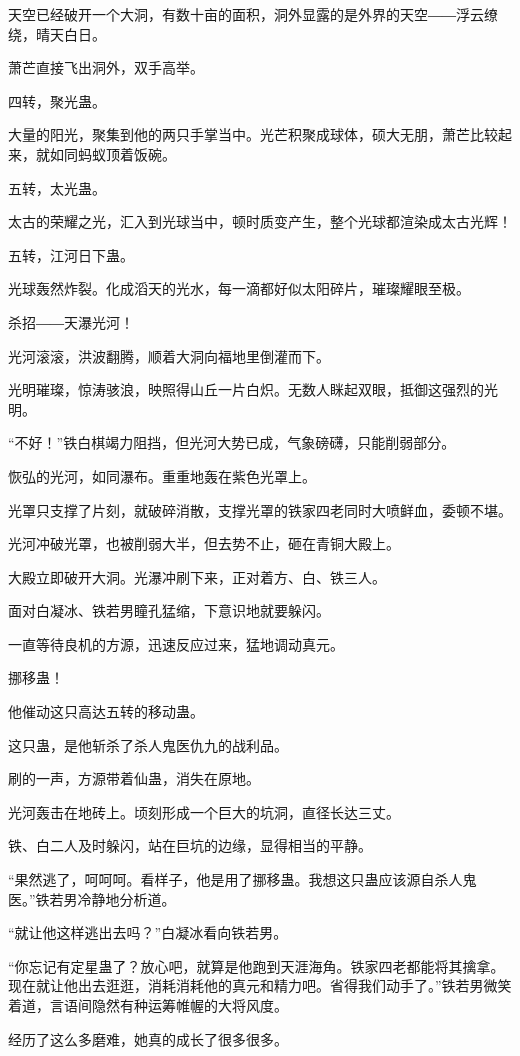 \begin{this_body}
天空已经破开一个大洞，有数十亩的面积，洞外显露的是外界的天空――浮云缭绕，晴天白日。

萧芒直接飞出洞外，双手高举。

四转，聚光蛊。

大量的阳光，聚集到他的两只手掌当中。光芒积聚成球体，硕大无朋，萧芒比较起来，就如同蚂蚁顶着饭碗。

五转，太光蛊。

太古的荣耀之光，汇入到光球当中，顿时质变产生，整个光球都渲染成太古光辉！

五转，江河日下蛊。

光球轰然炸裂。化成滔天的光水，每一滴都好似太阳碎片，璀璨耀眼至极。

杀招――天瀑光河！

光河滚滚，洪波翻腾，顺着大洞向福地里倒灌而下。

光明璀璨，惊涛骇浪，映照得山丘一片白炽。无数人眯起双眼，抵御这强烈的光明。

“不好！”铁白棋竭力阻挡，但光河大势已成，气象磅礴，只能削弱部分。

恢弘的光河，如同瀑布。重重地轰在紫色光罩上。

光罩只支撑了片刻，就破碎消散，支撑光罩的铁家四老同时大喷鲜血，委顿不堪。

光河冲破光罩，也被削弱大半，但去势不止，砸在青铜大殿上。

大殿立即破开大洞。光瀑冲刷下来，正对着方、白、铁三人。

面对白凝冰、铁若男瞳孔猛缩，下意识地就要躲闪。

一直等待良机的方源，迅速反应过来，猛地调动真元。

挪移蛊！

他催动这只高达五转的移动蛊。

这只蛊，是他斩杀了杀人鬼医仇九的战利品。

刷的一声，方源带着仙蛊，消失在原地。

光河轰击在地砖上。顷刻形成一个巨大的坑洞，直径长达三丈。

铁、白二人及时躲闪，站在巨坑的边缘，显得相当的平静。

“果然逃了，呵呵呵。看样子，他是用了挪移蛊。我想这只蛊应该源自杀人鬼医。”铁若男冷静地分析道。

“就让他这样逃出去吗？”白凝冰看向铁若男。

“你忘记有定星蛊了？放心吧，就算是他跑到天涯海角。铁家四老都能将其擒拿。现在就让他出去逛逛，消耗消耗他的真元和精力吧。省得我们动手了。”铁若男微笑着道，言语间隐然有种运筹帷幄的大将风度。

经历了这么多磨难，她真的成长了很多很多。


\end{this_body}

